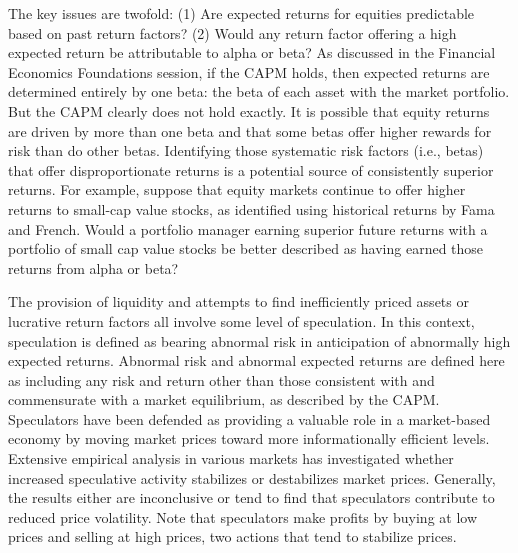 \documentclass[11pt]{article}
\begin{document}
The key issues are twofold: (1) Are expected returns for equities predictable based on past return factors? (2) Would any return factor offering a high expected return be attributable to alpha or beta? As discussed in the Financial Economics Foundations session, if the CAPM holds, then expected returns are determined entirely by one beta: the beta of each asset with the market portfolio. But the CAPM clearly does not hold exactly. It is possible that equity returns are driven by more than one beta and that some betas offer higher rewards for risk than do other betas. Identifying those systematic risk factors (i.e., betas) that offer disproportionate returns is a potential source of consistently superior returns. For example, suppose that equity markets continue to offer higher returns to small-cap value stocks, as identified using historical returns by Fama and French. Would a portfolio manager earning superior future returns with a portfolio of small cap value stocks be better described as having earned those returns from alpha or beta?

The provision of liquidity and attempts to find inefficiently priced assets or lucrative return factors all involve some level of speculation. In this context, speculation is defined as bearing abnormal risk in anticipation of abnormally high expected returns. Abnormal risk and abnormal expected returns are defined here as including any risk and return other than those consistent with and commensurate with a market equilibrium, as described by the CAPM. Speculators have been defended as providing a valuable role in a market-based economy by moving market prices toward more informationally efficient levels. Extensive empirical analysis in various markets has investigated whether increased speculative activity stabilizes or destabilizes market prices. Generally, the results either are inconclusive or tend to find that speculators contribute to reduced price volatility. Note that speculators make profits by buying at low prices and selling at high prices, two actions that tend to stabilize prices.
\end{document}
